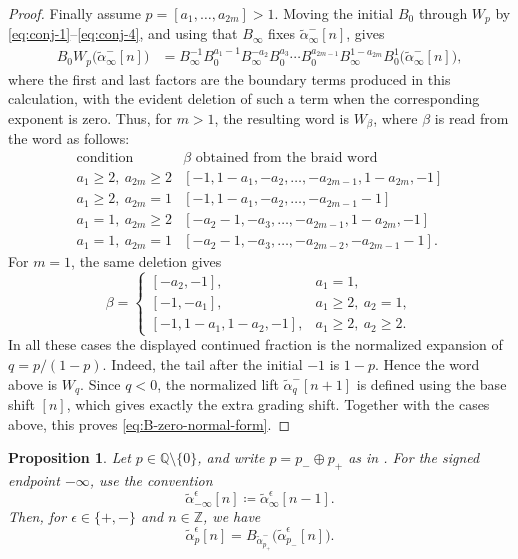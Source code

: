 \documentclass[11pt,a4paper,reqno]{amsart}%
\theoremstyle{plain}
\newtheorem{proposition}[proposition]{Proposition}
\theoremstyle{definition}
\numberwithin{equation}{section}
\numberwithin{equation}{section}
\def\ZZ{\mathbb{Z}}
\begin{document}
\begin{proof}
Finally assume 
$p=[a_1,\ldots,a_{2m}]>1$. Moving the initial $B_0$ through $W_p$ by
\eqref{eq:conj-1}--\eqref{eq:conj-4}, and using that $B_\infty$ fixes
$\widetilde{\alpha}_\infty^-[n]$, gives
\[
\begin{aligned}
B_0W_p\bigl(\widetilde{\alpha}_\infty^-[n]\bigr)
&=B_\infty^{-1}B_0^{a_1-1}B_\infty^{-a_2}B_0^{a_3}\cdots
  B_0^{a_{2m-1}}B_\infty^{1-a_{2m}}B_0^{1}
  \bigl(\widetilde{\alpha}_\infty^-[n]\bigr),
\end{aligned}
\]
where the first and last factors are the boundary terms produced in this
calculation, with the evident deletion of such a term when the corresponding
exponent is zero. Thus, for $m>1$, the resulting word is $W_\beta$, where
$\beta$ is read from the word as follows:
\[
\begin{array}{c|c}
\text{condition} & \beta \text{ obtained from the braid word}\\ \hline
a_1\ge 2,\ a_{2m}\ge 2
& [-1,1-a_1,-a_2,\ldots,-a_{2m-1},1-a_{2m},-1]\\[2pt]
a_1\ge 2,\ a_{2m}=1
& [-1,1-a_1,-a_2,\ldots,-a_{2m-1}-1]\\[2pt]
a_1=1,\ a_{2m}\ge 2
& [-a_2-1,-a_3,\ldots,-a_{2m-1},1-a_{2m},-1]\\[2pt]
a_1=1,\ a_{2m}=1
& [-a_2-1,-a_3,\ldots,-a_{2m-2},-a_{2m-1}-1].
\end{array}
\]
For $m=1$, the same deletion gives
\[
\beta=
\begin{cases}
[-a_2,-1],& a_1=1,\\
[-1,-a_1],& a_1\ge2,\ a_2=1,\\
[-1,1-a_1,1-a_2,-1],& a_1\ge2,\ a_2\ge2.
\end{cases}
\]
In all these cases the displayed continued fraction is the normalized expansion of
$q=p/(1-p)$.  Indeed, the tail after the initial $-1$ is
$1-p$. Hence the word above is $W_q$. Since $q<0$, the normalized lift
$\widetilde{\alpha}_q^-[n+1]$ is defined using the base shift $[n]$, which gives
exactly the extra grading shift. Together with the cases above, this proves \eqref{eq:B-zero-normal-form}.
\end{proof}
\begin{proposition}\label{prop:farey-braid-recursion}
Let $p\in\mathbb Q\setminus\{0\}$, and write $p=p_-\oplus p_+$ as in
. For the signed endpoint $-\infty$, use the
convention
\[
\widetilde{\alpha}_{-\infty}^\epsilon[n]
\coloneqq\widetilde{\alpha}_\infty^\epsilon[n-1].
\]
Then, for $\epsilon\in\{+,-\}$ and $n\in\ZZ$, we have
\[
\widetilde{\alpha}_p^\epsilon[n]
=B_{\widetilde{\alpha}_{p_+}^{-}}
\bigl(\widetilde{\alpha}_{p_-}^\epsilon[n]\bigr).
\]
\end{proposition}
\end{document}
